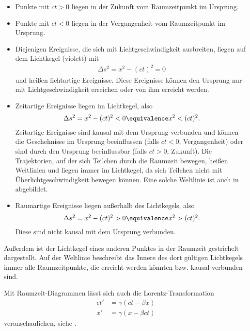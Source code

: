 \begin{itemize}
    \item Punkte mit $ct>0$ liegen in der Zukunft vom Raumzeitpunkt im Ursprung.
    \item Punkte mit $ct<0$ liegen in der Vergangenheit vom Raumzeitpunkt im Ursprung.
    \item Diejenigen Ereignisse, die sich mit Lichtgeschwindigkeit ausbreiten, liegen auf dem Lichtkegel (violett) mit
          \begin{align*}
              \Delta s^2=x^2-(ct)^2=0
          \end{align*}
          und heißen lichtartige Ereignisse. Diese Ereignisse können den Ursprung nur mit Lichtgeschwindigkeit erreichen oder von ihm erreicht werden.
    \item Zeitartige Ereignisse liegen im Lichtkegel, also
          \begin{align*}
              \Delta s^2 = x^2-(ct)^2 < 0 \equivalence x^2 < (ct)^2.
          \end{align*}
          Zeitartige Ereignisse sind kausal mit dem Ursprung verbunden und können die Geschehnisse im Ursprung beeinflussen (falls $ct<0$, Vergangenheit) oder sind durch den Ursprung
          beeinflussbar (falls $ct>0$, Zukunft). Die Trajektorien, auf der sich Teilchen durch die Raumzeit bewegen, heißen Weltlinien und liegen immer im Lichtkegel, da sich Teilchen nicht mit
          Überlichtgeschwindigkeit bewegen können. Eine solche Weltlinie ist auch in  abgebildet.
    \item Raumartige Ereignisse liegen außerhalb des Lichtkegels, also
          \begin{align*}
              \Delta s^2 = x^2-(ct)^2 > 0 \equivalence x^2 > (ct)^2.
          \end{align*}
          Diese sind nicht kausal mit dem Ursprung verbunden.
\end{itemize}

Außerdem ist der Lichtkegel eines anderen Punktes in der Raumzeit gestrichelt dargestellt.
Auf der Weltlinie beschreibt das Innere des dort gültigen Lichtkegels immer alle Raumzeitpunkte, die erreicht werden könnten bzw. kausal verbunden sind.


Mit Raumzeit-Diagrammen lässt sich auch die Lorentz-Transformation
\begin{align*}
    ct' & =\gamma(ct-\beta x) \\
    x'  & =\gamma(x-\beta ct)
\end{align*}
veranschaulichen, siehe .

